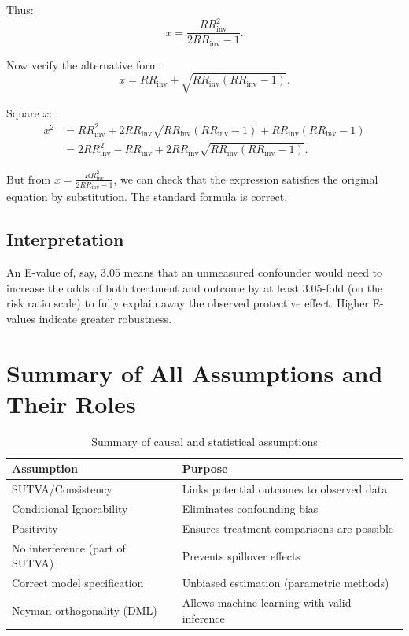\documentclass[12pt]{article}
\numberwithin{equation}{section}
\begin{document}
	Thus:
	\[
	x = \frac{RR_{\text{inv}}^2}{2RR_{\text{inv}} - 1}.
	\]
	
	Now verify the alternative form:
	\[
	x = RR_{\text{inv}} + \sqrt{RR_{\text{inv}}(RR_{\text{inv}}-1)}.
	\]
	
	Square $x$:
	\begin{align*}
		x^2 &= RR_{\text{inv}}^2 + 2RR_{\text{inv}}\sqrt{RR_{\text{inv}}(RR_{\text{inv}}-1)} + RR_{\text{inv}}(RR_{\text{inv}}-1) \\
		&= 2RR_{\text{inv}}^2 - RR_{\text{inv}} + 2RR_{\text{inv}}\sqrt{RR_{\text{inv}}(RR_{\text{inv}}-1)}.
	\end{align*}
	
	But from $x = \frac{RR_{\text{inv}}^2}{2RR_{\text{inv}}-1}$, we can check that the expression satisfies the original equation by substitution. The standard formula is correct.
	
	\subsection{Interpretation}
	
	An E-value of, say, 3.05 means that an unmeasured confounder would need to increase the odds of both treatment and outcome by at least 3.05-fold (on the risk ratio scale) to fully explain away the observed protective effect. Higher E-values indicate greater robustness.
	
	\section{Summary of All Assumptions and Their Roles}
	
	\begin{table}[h!]
		\centering
		\begin{tabular}{|l|l|}
			\hline
			\textbf{Assumption} & \textbf{Purpose} \\
			\hline
			SUTVA/Consistency & Links potential outcomes to observed data \\
			Conditional Ignorability & Eliminates confounding bias \\
			Positivity & Ensures treatment comparisons are possible \\
			No interference (part of SUTVA) & Prevents spillover effects \\
			Correct model specification & Unbiased estimation (parametric methods) \\
			Neyman orthogonality (DML) & Allows machine learning with valid inference \\
			\hline
		\end{tabular}
		\caption{Summary of causal and statistical assumptions}
	\end{table}
	
\end{document}
